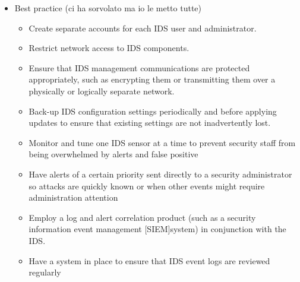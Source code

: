 \documentclass{article}
\begin{document}
\begin{itemize}
\begin{itemize}
\begin{itemize}
        \end{itemize}
        \item Best practice (ci ha sorvolato ma io le metto tutte)
        \begin{itemize}
            \item Create separate accounts for each IDS user and administrator.
            \item Restrict network access to IDS components.
            \item Ensure that IDS management communications are protected appropriately, such as encrypting them or transmitting them over a physically or logically separate network.
            \item Back-up IDS configuration settings periodically and before applying updates to ensure that existing settings are not inadvertently lost.
            \item Monitor and tune one IDS sensor at a time to prevent security staff from being overwhelmed by alerts and false positive
            \item Have alerts of a certain priority sent directly to a security administrator so attacks are quickly known or when other events might require administration attention
            \item Employ a log and alert correlation product (such as a security information event management [SIEM]system) in conjunction with the IDS.
            \item Have a system in place to ensure that IDS event logs are reviewed regularly
        \end{itemize}
    \end{itemize}   
\end{itemize}
\end{document}
